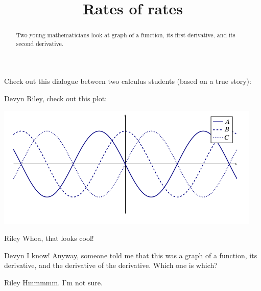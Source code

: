 \documentclass{ximera}
\title[Break-Ground:]{Rates of rates}
\begin{document}
\begin{abstract}
Two young mathematicians look at graph of a function, its first derivative, and its second derivative.
\end{abstract}
\maketitle

Check out this dialogue between two calculus students (based on a true
story):

\begin{dialogue}
\item[Devyn] Riley, check out this plot:
  \begin{image}
    \includegraphics{backUp2.png}
  \end{image}
  \item[Riley] Whoa, that looks cool!
  \item[Devyn] I know! Anyway, someone told me that this was a graph
    of a function, its derivative, and the derivative of the
    derivative.  Which one is which?
  \item[Riley] Hmmmmm. I'm not sure.
\end{dialogue}
\end{document}
